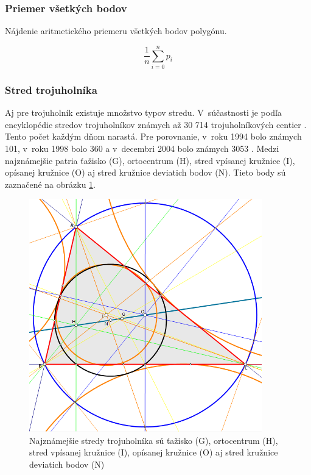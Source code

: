 \subsubsection{Priemer všetkých bodov}
Nájdenie aritmetického priemeru všetkých bodov polygónu.

\begin{equation}
    \frac{1}{n} \sum_{i=0}^{n} p_i   
    \label{eq:aritPriemer}
\end{equation}


\subsubsection{Stred trojuholníka}
Aj pre trojuholník existuje množstvo typov stredu. V~súčastnosti je podľa encyklopédie stredov trojuholníkov známych až 30 714 trojuholníkových centier \cite{kimberling_2019}. Tento počet každým dňom narastá. Pre porovnanie, v~roku 1994 bolo známych 101, v~roku 1998 bolo 360 a v~decembri 2004 bolo známych 3053 \cite{Kimberling_Center_2004}. Medzi najznámejšie patria ťažisko (G), ortocentrum (H), stred vpísanej kružnice (I), opísanej kružnice (O) aj stred kružnice deviatich bodov (N). Tieto body sú zaznačené na obrázku \ref{fig:TriangleCenters}.


\begin{figure}[H]
	\centering
	\includegraphics[width=0.9\textwidth]{obrazky-figures/Trigonometric_centres.png}
	\caption{Najznámejšie stredy trojuholníka sú ťažisko (G), ortocentrum (H), stred vpísanej kružnice (I), opísanej kružnice (O) aj stred kružnice deviatich bodov (N) \cite{triangle_center_2012}}
	\label{fig:TriangleCenters}
\end{figure}


